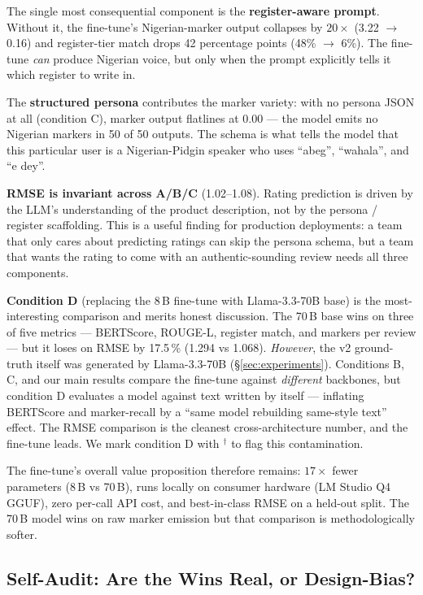 \documentclass[sigconf,nonacm,balance]{acmart}
\begin{document}
The single most consequential component is the \textbf{register-aware
prompt}. Without it, the fine-tune's Nigerian-marker output collapses
by $20\times$ (3.22 $\to$ 0.16) and register-tier match drops 42
percentage points (48\% $\to$ 6\%). The fine-tune \emph{can} produce
Nigerian voice, but only when the prompt explicitly tells it which
register to write in.

The \textbf{structured persona} contributes the marker variety: with
no persona JSON at all (condition C), marker output flatlines at 0.00
--- the model emits no Nigerian markers in 50 of 50 outputs. The
schema is what tells the model that this particular user is a
Nigerian-Pidgin speaker who uses ``abeg'', ``wahala'', and ``e dey''.

\textbf{RMSE is invariant across A/B/C} (1.02--1.08). Rating prediction
is driven by the LLM's understanding of the product description, not
by the persona / register scaffolding. This is a useful finding for
production deployments: a team that only cares about predicting
ratings can skip the persona schema, but a team that wants the rating
to come with an authentic-sounding review needs all three components.

\textbf{Condition D} (replacing the 8\,B fine-tune with Llama-3.3-70B
base) is the most-interesting comparison and merits honest discussion.
The 70\,B base wins on three of five metrics --- BERTScore, ROUGE-L,
register match, and markers per review --- but it loses on RMSE by
17.5\,\% (1.294 vs 1.068). \emph{However}, the v2 ground-truth itself
was generated by Llama-3.3-70B (§\ref{sec:experiments}). Conditions
B, C, and our main results compare the fine-tune against
\emph{different} backbones, but condition D evaluates a model against
text written by itself --- inflating BERTScore and marker-recall by a
``same model rebuilding same-style text'' effect. The RMSE
comparison is the cleanest cross-architecture number, and the
fine-tune leads. We mark condition D with $^\dagger$ to flag this
contamination.

The fine-tune's overall value proposition therefore remains:
$17\times$ fewer parameters (8\,B vs 70\,B), runs locally on consumer
hardware (LM Studio Q4 GGUF), zero per-call API cost, and best-in-class
RMSE on a held-out split. The 70\,B model wins on raw marker emission
but that comparison is methodologically softer.

\subsection{Self-Audit: Are the Wins Real, or Design-Bias?}
\label{sec:audit}
\end{document}
